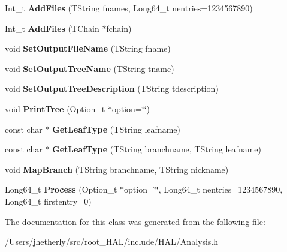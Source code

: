 \begin{DoxyCompactItemize}
\item 
\hypertarget{class_h_a_l_1_1_analysis_a540cf522be42290e16d6ac0c7dbff0ba}{Int\-\_\-t {\bfseries Add\-Files} (T\-String fnames, Long64\-\_\-t nentries=1234567890)}\label{class_h_a_l_1_1_analysis_a540cf522be42290e16d6ac0c7dbff0ba}

\item 
\hypertarget{class_h_a_l_1_1_analysis_af8fccc1f3c27d6402ecad559648b7ff0}{Int\-\_\-t {\bfseries Add\-Files} (T\-Chain $\ast$fchain)}\label{class_h_a_l_1_1_analysis_af8fccc1f3c27d6402ecad559648b7ff0}

\item 
\hypertarget{class_h_a_l_1_1_analysis_a9e6b12787599c0c36f576350e2e93b8d}{void {\bfseries Set\-Output\-File\-Name} (T\-String fname)}\label{class_h_a_l_1_1_analysis_a9e6b12787599c0c36f576350e2e93b8d}

\item 
\hypertarget{class_h_a_l_1_1_analysis_a50f84d17528b7ba7621c65696dd81e75}{void {\bfseries Set\-Output\-Tree\-Name} (T\-String tname)}\label{class_h_a_l_1_1_analysis_a50f84d17528b7ba7621c65696dd81e75}

\item 
\hypertarget{class_h_a_l_1_1_analysis_a6461758cc06f7a334a487d857172983a}{void {\bfseries Set\-Output\-Tree\-Description} (T\-String tdescription)}\label{class_h_a_l_1_1_analysis_a6461758cc06f7a334a487d857172983a}

\item 
\hypertarget{class_h_a_l_1_1_analysis_afccfbae795035cfe75578fa805aefa93}{void {\bfseries Print\-Tree} (Option\-\_\-t $\ast$option=\char`\"{}\char`\"{})}\label{class_h_a_l_1_1_analysis_afccfbae795035cfe75578fa805aefa93}

\item 
\hypertarget{class_h_a_l_1_1_analysis_a7c6603a4cc7b74591f5c0427f59023d5}{const char $\ast$ {\bfseries Get\-Leaf\-Type} (T\-String leafname)}\label{class_h_a_l_1_1_analysis_a7c6603a4cc7b74591f5c0427f59023d5}

\item 
\hypertarget{class_h_a_l_1_1_analysis_a8410426a53f7828270531f1ec56340b8}{const char $\ast$ {\bfseries Get\-Leaf\-Type} (T\-String branchname, T\-String leafname)}\label{class_h_a_l_1_1_analysis_a8410426a53f7828270531f1ec56340b8}

\item 
\hypertarget{class_h_a_l_1_1_analysis_a6e11fa65e712377587ed4b6a1a62c8aa}{void {\bfseries Map\-Branch} (T\-String branchname, T\-String nickname)}\label{class_h_a_l_1_1_analysis_a6e11fa65e712377587ed4b6a1a62c8aa}

\item 
\hypertarget{class_h_a_l_1_1_analysis_a4278a2e961076913371dec71da389701}{Long64\-\_\-t {\bfseries Process} (Option\-\_\-t $\ast$option=\char`\"{}\char`\"{}, Long64\-\_\-t nentries=1234567890, Long64\-\_\-t firstentry=0)}\label{class_h_a_l_1_1_analysis_a4278a2e961076913371dec71da389701}

\end{DoxyCompactItemize}


The documentation for this class was generated from the following file\-:\begin{DoxyCompactItemize}
\item 
/\-Users/jhetherly/src/root\-\_\-\-H\-A\-L/include/\-H\-A\-L/Analysis.\-h\end{DoxyCompactItemize}
